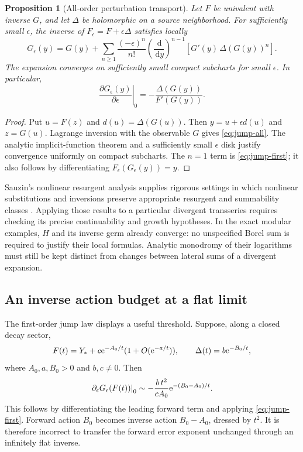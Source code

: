 \documentclass[11pt,a4paper]{article}
\numberwithin{equation}{section}
\newtheorem{proposition}[theorem]{Proposition}
\theoremstyle{definition}\newtheorem{definition}[theorem]{Definition}
\theoremstyle{remark}\newtheorem{remark}[theorem]{Remark}
\newcommand{\dd}{\,\mathrm d}\newcommand{\eps}{\varepsilon}
\begin{document}
\begin{proposition}[All-order perturbation transport]\label{prop:jumps}
Let $F$ be univalent with inverse $G$, and let $\Delta$ be holomorphic
on a source neighborhood. For sufficiently small $\epsilon$, the inverse
of $F_\epsilon=F+\epsilon\Delta$ satisfies locally
\begin{equation}\label{eq:jump-all}
 G_\epsilon(y)=G(y)+\sum_{n\ge1}\frac{(-\epsilon)^n}{n!}
 \left(\frac{\dd}{\dd y}\right)^{n-1}
 \left[G'(y)\,\Delta(G(y))^n\right].
\end{equation}
The expansion converges on sufficiently small compact subcharts for
small $\epsilon$. In particular,
\begin{equation}\label{eq:jump-first}
 \left.\frac{\partial G_\epsilon(y)}{\partial\epsilon}\right|_{0}
       =-\frac{\Delta(G(y))}{F'(G(y))}.
\end{equation}
\end{proposition}
\begin{proof}
Put $u=F(z)$ and $d(u)=\Delta(G(u))$. Then
$y=u+\epsilon d(u)$ and $z=G(u)$. Lagrange inversion with the observable
$G$ gives \eqref{eq:jump-all}. The analytic implicit-function theorem
and a sufficiently small $\epsilon$ disk justify convergence uniformly
on compact subcharts. The $n=1$ term is \eqref{eq:jump-first}; it also
follows by differentiating $F_\epsilon(G_\epsilon(y))=y$.
\end{proof}
Sauzin's nonlinear resurgent analysis supplies rigorous settings in
which nonlinear substitutions and inversions preserve appropriate
resurgent and summability classes \cite{sauzin}. Applying those results
to a particular divergent transseries requires checking its precise
continuability and growth hypotheses. In the exact modular examples,
$H$ and its inverse germ already converge: no unspecified Borel sum is
required to justify their local formulas. Analytic monodromy of their
logarithms must still be kept distinct from changes between lateral sums
of a divergent expansion.

\subsection{An inverse action budget at a flat limit}
The first-order jump law displays a useful threshold. Suppose, along a
closed decay sector,
\[
 F(t)=Y_*+c\mathrm e^{-A_0/t}(1+O(\mathrm e^{-a/t})),\qquad
 \Delta(t)=b\mathrm e^{-B_0/t},
\]
where $A_0,a,B_0>0$ and $b,c\ne0$. Then
\begin{equation}\label{eq:jump-action-budget}
 \left.\partial_\epsilon G_\epsilon(F(t))\right|_0
 \sim-\frac{b\,t^2}{cA_0}\mathrm e^{-(B_0-A_0)/t}.
\end{equation}
This follows by differentiating the leading forward term and applying
\eqref{eq:jump-first}. Forward action $B_0$ becomes inverse action
$B_0-A_0$, dressed by $t^2$. It is therefore incorrect to transfer the
forward error exponent unchanged through an infinitely flat inverse.
\end{document}
